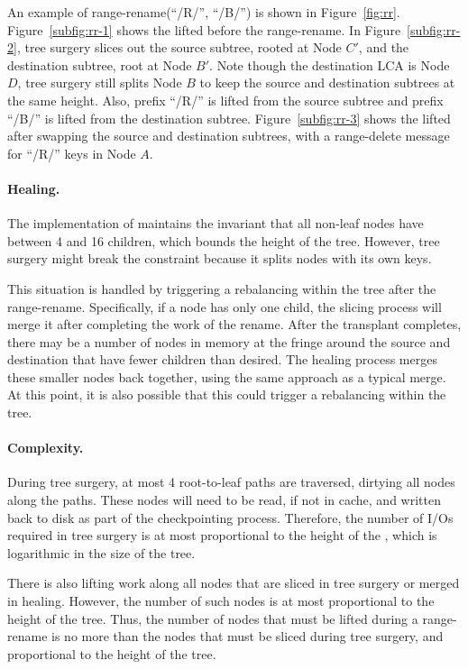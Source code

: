 An example of range-rename(``/R/'', ``/B/'') is shown in Figure~\ref{fig:rr}.
Figure~\ref{subfig:rr-1} shows the lifted \bet before the range-rename.
In Figure~\ref{subfig:rr-2}, tree surgery slices out the source subtree, rooted
at Node $C'$, and the destination subtree, root at Node $B'$.
Note though the destination LCA is Node $D$, tree surgery still splits Node $B$
to keep the source and destination subtrees at the same height.
Also, prefix ``/R/'' is lifted from the source subtree and prefix ``/B/''
is lifted from the destination subtree.
Figure~\ref{subfig:rr-3} shows the lifted \bet after swapping the source and
destination subtrees, with a range-delete message for ``/R/'' keys in Node $A$.

\paragraph{Healing.}
The \fti implementation of \bets maintains the invariant that all non-leaf nodes
have between 4 and 16 children, which bounds the height of the tree.
However, tree surgery might break the constraint because it splits nodes with
its own keys.

This situation is handled by triggering a rebalancing within the tree after
the range-rename.
Specifically, if a node has only one child, the slicing process will merge
it after completing the work of the rename.
After the transplant completes, there may be a number of \bet nodes in memory at
the fringe around the source and destination that have fewer children than
desired.
The healing process merges these smaller nodes back together,
using the same approach as a typical \bet merge.
At this point, it is also possible that this could trigger a rebalancing within
the tree.

\paragraph{Complexity.}
During tree surgery, at most 4 root-to-leaf paths are traversed, dirtying all
nodes along the paths.
These nodes will need to be read, if not in cache, and written back to disk as
part of the checkpointing process.
Therefore, the number of I/Os required in tree surgery is at most proportional
to the height of the \bet, which is logarithmic in the size of the tree.

There is also lifting work along all nodes that are sliced in tree surgery or
merged in healing.
However, the number of such nodes is at most proportional to the height of the
tree.
Thus, the number of nodes that must be lifted during a range-rename is no more
than the nodes that must be sliced during tree surgery, and proportional to
the height of the tree.

